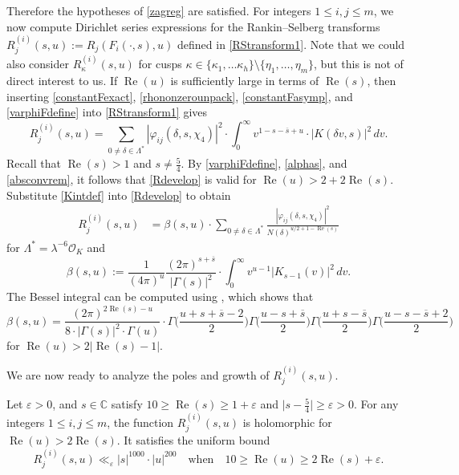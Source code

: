 \documentclass[12pt,reqno]{amsart}
\numberwithin{equation}{section}
\renewcommand{\Re}{\operatorname{Re}}
\begin{document}
Therefore the hypotheses of \cref{zagreg} are satisfied. For integers $1 \leq i,j \leq m$, we now compute Dirichlet series expressions for the Rankin--Selberg transforms $R_j^{(i)}(s, u) := R_{j}(F_{i}(\cdot,s),u)$ defined in \eqref{RStransform1}. Note that we could also consider $R_{\kappa}^{(i)}(s, u)$ for cusps $\kappa \in \{\kappa_1,\ldots \kappa_h\} \setminus \{\eta_1,\ldots,\eta_m \}$, but this is not of direct interest to us. If $\Re(u)$ is sufficiently large in terms of $\Re(s)$, then inserting \eqref{constantFexact}, \eqref{rhononzerounpack}, \eqref{constantFasymp}, and \eqref{varphiFdefine} into \eqref{RStransform1} gives
\begin{equation} \label{Rdevelop}
    R_{j}^{(i)}(s, u) = \sum_{0 \neq \delta \in \Lambda^{*}} |\varphi_{i j}(\delta,s,\chi_4)|^2 \cdot \int_{0}^{\infty} v^{1-s-\overline{s} +u} \cdot |K(\delta v,s)|^2 \, dv.
\end{equation}
Recall that $\Re(s)>1$ and $s \neq \frac{5}{4}$. By \eqref{varphiFdefine}, \eqref{alphas}, and \cref{absconvrem}, it follows that \eqref{Rdevelop} is valid for $\Re(u) > 2+2 \Re(s)$. Substitute \eqref{Kintdef} into \eqref{Rdevelop} to obtain
\begin{align}\label{eq:R_j_i_def}
    R_{j}^{(i)}(s, u) &= \beta(s, u) \cdot \sum_{0 \neq \delta \in \Lambda^{*} } \frac{|\varphi_{i j}(\delta,s,\chi_4)|^2}{N(\delta)^{u/2+1-\Re(s)}}
\end{align}
for $\Lambda^{*} = \lambda^{-6}\mathcal{O}_K$ and
\begin{equation} \label{betadef}
    \beta(s, u) := \frac{1}{(4 \pi)^{u}}\frac{(2 \pi)^{s+\overline{s}}}{ |\Gamma(s)|^2} \cdot \int_{0}^{\infty} v^{u-1}  |K_{s-1}(v)|^2 \, dv.
\end{equation}
The Bessel integral can be computed using \cite[(6.576.4)]{GR}, which shows that 
\begin{equation} \label{betaeval}
    \beta(s, u)= \frac{(2\pi)^{2 \Re(s)-u}}{8 \cdot |\Gamma(s)|^{2} \cdot \Gamma(u)} \cdot \Gamma \Big ( \frac{u+s+\overline{s}-2}{2} \Big) \Gamma \Big( \frac{u-s+\overline{s}}{2} \Big) \Gamma \Big( \frac{u+s-\overline{s}}{2} \Big) \Gamma \Big(\frac{u-s-\overline{s}+2}{2} \Big)
\end{equation}
for $\Re(u) > 2\left|\Re(s) - 1\right|$. 

We are now ready to analyze the poles and growth of $R_{j}^{(i)}(s,u)$.

\begin{lemma}\label{Filem}
    Let $\varepsilon>0$, and $s \in \mathbb{C}$ satisfy $10 \geq \Re(s)\geq 1 + \varepsilon$ and $\big|s - \frac{5}{4}\big| \geq \varepsilon > 0$. For any integers $1\leq i, j\leq m$, the function $R_{j}^{(i)}(s, u)$ is holomorphic for $\Re(u)> 2 \Re(s)$. It satisfies the uniform bound
    \begin{equation}\label{eq:R_j_uniform_bound}
        R_{j}^{(i)}(s, u) \ll_\varepsilon |{s}|^{1000} \cdot |{u}|^{200} \quad \text{when} \quad 10 \geq \Re(u) \geq 2\Re(s) + \varepsilon.
    \end{equation}
\end{lemma}
\end{document}
